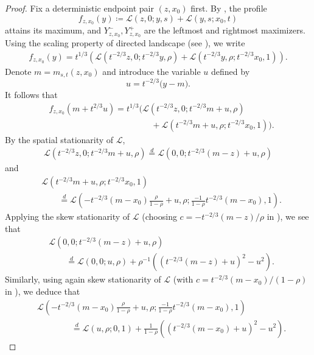 \documentclass[12pt, reqno]{amsart}
\numberwithin{equation}{section}
\theoremstyle{definition}
\newcommand{\Lcal}{\mathcal{L}}
\begin{document}
\begin{proof}
  Fix a deterministic endpoint pair $(z,x_0)$ first.  By \cite[Lemma
  10.8]{dauvergne.ortmann.ea:22:directed}, the profile
  \[
    f_{z,x_0}(y) \coloneqq \Lcal(z,0;y,s)+\Lcal(y,s;x_0,t)
  \]
  attains its maximum, and $Y^-_{z,x_0},Y^+_{z,x_0}$ are the leftmost and
  rightmost maximizers. Using the scaling property of directed landscape (see
  \cite[Lemma 10.2(5)]{dauvergne.ortmann.ea:22:directed}), we write
  \begin{align*}
    f_{z,x_0}(y)=t^{1/3}\left(\Lcal(t^{-2/3}z,0;t^{-2/3}y,\rho)+\Lcal(t^{-2/3}y,\rho; t^{-2/3}x_0,1)\right).
  \end{align*}
  Denote $m=m_{s,t}(z,x_0)$ and introduce the variable $u$ defined by
  \[
    u=t^{-2/3}\bigl(y-m\bigr).
  \]
  It follows that
  \begin{align*}
   & f_{z,x_0}(m+t^{2/3}u)=t^{1/3}\big(\Lcal(t^{-2/3}z,0;t^{-2/3}m+u,\rho) \\
   & \qquad \qquad\qquad\qquad \qquad\qquad +\Lcal(t^{-2/3}m+u,\rho; t^{-2/3}x_0,1)\big).
  \end{align*}
  By the spatial stationarity of $\Lcal$, 
  \begin{align*}
    \Lcal(t^{-2/3}z,0;t^{-2/3}m+u,\rho) \overset{d}{=} \Lcal(0,0;t^{-2/3}(m-z)+u,\rho)
  \end{align*}
  and 
  \begin{align*}
    & \Lcal(t^{-2/3}m+u,\rho; t^{-2/3}x_0,1) \\
    & \qquad\overset{d}{=} \Lcal(-t^{-2/3}(m-x_0)\frac{\rho}{1-\rho}+u,\rho; \frac{-1}{1-\rho}t^{-2/3}(m-x_0),1).
  \end{align*}
  Applying the skew stationarity of $\Lcal$ (choosing $c=-t^{-2/3}(m-z)/\rho$
  in \cite[Lemma 10.2(4)]{dauvergne.ortmann.ea:22:directed}), we see that
  \begin{align}\label{E:law1}
    & \Lcal(0,0;t^{-2/3}(m-z)+u,\rho) \nonumber \\
    & \qquad\overset{d}{=} \Lcal(0,0;u,\rho)+ \rho^{-1}\left((t^{-2/3}(m-z)+u)^2-u^2\right).
  \end{align}
  Similarly, using again skew stationarity of $\Lcal$ (with
  $c=t^{-2/3}(m-x_0)/(1-\rho)$ in \cite[Lemma
  10.2(4)]{dauvergne.ortmann.ea:22:directed}), we deduce that
  \begin{align}\label{E:law2}
    & \Lcal(-t^{-2/3}(m-x_0)\frac{\rho}{1-\rho}+u,\rho; \frac{-1}{1-\rho}t^{-2/3}(m-x_0),1) \nonumber \\
    & \quad\qquad\quad \overset{d}{=} \Lcal(u, \rho; 0,1)+\frac{1}{1-\rho}\left((t^{-2/3}(m-x_0)+u)^2- u^2\right).

\end{align}
\end{proof}
\end{document}
